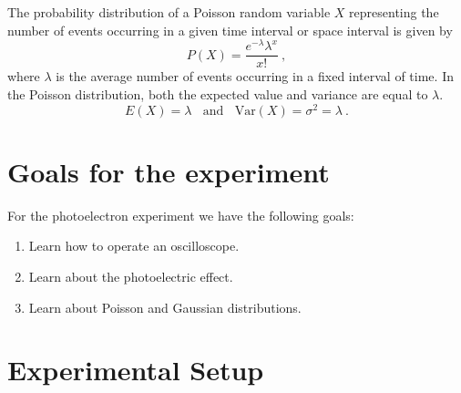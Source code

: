 \documentclass[10pt,aps,twocolumn,secnumarabic,balancelastpage,amsmath,amssymb,nofootinbib,floatfix]{revtex4}
\begin{document}
The probability distribution of a Poisson random variable $X$ representing the number of events occurring in a given time interval or space interval is given by
\begin{equation}
  P(X) = \frac{e^{-\lambda} \lambda^{x}}{x!} \ ,
\end{equation}
where $\lambda$ is the average number of events occurring in a fixed interval of time. In the Poisson distribution, both the expected value and variance are equal to $\lambda$. 
\begin{equation}
  E(X) = \lambda ~~~~\text {and} ~~~~ \text{Var}(X) = \sigma^2 = \lambda \ .
\end{equation}

\section{Goals for the experiment}

For the photoelectron experiment we have the following goals:
\begin{enumerate}
\item Learn how to operate an oscilloscope.
\item Learn about the photoelectric effect.
\item Learn about Poisson and Gaussian distributions.
\end{enumerate}

\section{Experimental Setup}
\end{document}
